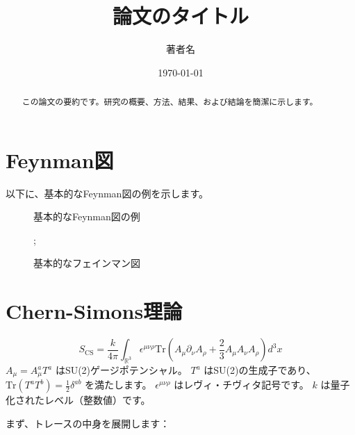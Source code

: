 \documentclass[a4paper,12pt]{article}
\title{論文のタイトル}
\author{著者名}
\date{\today}
\begin{document}
\maketitle


\begin{abstract}
この論文の要約です。研究の概要、方法、結果、および結論を簡潔に示します。
\end{abstract}


\section{Feynman図}
以下に、基本的なFeynman図の例を示します。

\begin{figure}[h]
    \centering
    \caption{基本的なFeynman図の例}
    \label{fig:feynman}
\end{figure}


\begin{figure}[h]
    \centering
    ;
    \caption{基本的なフェインマン図}
  \end{figure}
\section{Chern-Simons理論}
\begin{equation}
    S_{\mathrm{CS}} = \frac{k}{4\pi} \int_{\mathbb{R}^3} \epsilon^{\mu\nu\rho} \text{Tr} \left( A_\mu \partial_\nu A_\rho + \frac{2}{3} A_\mu A_\nu A_\rho \right) d^3x
\end{equation}
$ A_\mu = A_\mu^a T^a $ はSU(2)ゲージポテンシャル。
$ T^a $ はSU(2)の生成子であり、$ \text{Tr}(T^a T^b) = \frac{1}{2}\delta^{ab} $ を満たします。
$ \epsilon^{\mu\nu\rho} $ はレヴィ・チヴィタ記号です。
$ k $ は量子化されたレベル（整数値）です。

まず、トレースの中身を展開します：
\end{document}
